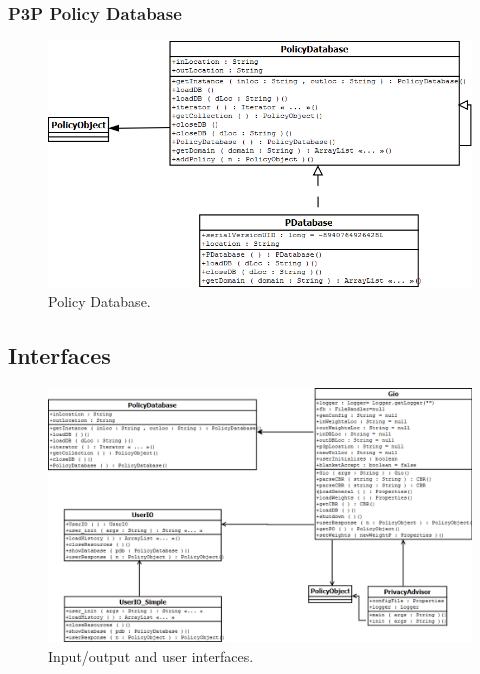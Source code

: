 \subsubsection{P3P Policy Database}

\begin{figure}[htbp]
\begin{center}
\includegraphics[width = \textwidth]{DesignReport/uml/pd.png}
\caption{Policy Database.}
\label{pd_fig}
\end{center}
\end{figure}

\subsection{Interfaces}

      



\begin{figure}[htbp]
\begin{center}
\includegraphics[width = \textwidth]{DesignReport/uml/gio.png}
\caption{Input/output and user interfaces.}
\label{UserIO}
\end{center}
\end{figure}






